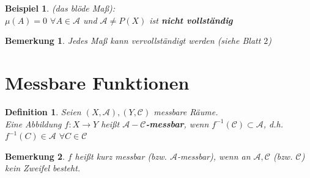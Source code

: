 \documentclass[11pt]{memoir}
\theoremstyle{changebreak}
\newtheorem{Definition}{Definition}[chapter]
\newtheorem{Bemerkung}{Bemerkung}[chapter]
\newtheorem{Beispiel}{Beispiel}[chapter]
\begin{document}
\begin{Beispiel}
(das blöde Maß): \\
$\mu(A) = 0$ $ \forall A \in \mathscr{A}$ und $\mathscr{A} \ne P(X)$ ist \textbf{nicht vollständig}
\end{Beispiel}

\begin{Bemerkung}
Jedes Maß kann vervollständigt werden (siehe Blatt $2$)
\end{Bemerkung}


\section{Messbare Funktionen}

\begin{Definition}
Seien $(X, \mathscr{A}), (Y, \mathscr{C})$ messbare Räume.\\
 Eine Abbildung $f: X \rightarrow Y$ heißt \textbf{$\mathscr{A}-\mathscr{C}$-messbar}, wenn $f^{-1}(\mathscr{C}) \subset \mathscr{A}$, d.h. $f^{-1}(C) \in \mathscr{A}$ $ \forall C \in \mathscr{C}$
\end{Definition}

\begin{Bemerkung}
$f$ heißt kurz messbar (bzw. $\mathscr{A}$-messbar), wenn an $\mathscr{A}, \mathscr{C}$ (bzw. $\mathscr{C}$) kein Zweifel besteht.
\end{Bemerkung}
\end{document}
